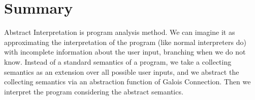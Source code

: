 \section*{Summary}

Abstract Interpretation is program analysis method.
We can imagine it as approximating the interpretation of the program (like normal interpreters do) with incomplete
information about the user input, branching when we do not know.
Instead of a standard semantics of a program, we take a collecting semantics as an extension over all possible user inputs,
and we abstract the collecting semantics via an abstraction function of Galois Connection.
Then we interpret the program considering the abstract semantics.
